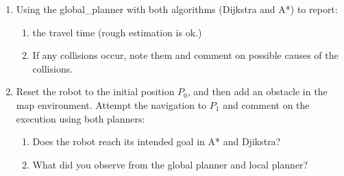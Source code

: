 \documentclass[12pt]{article}
\begin{document}
    \begin{enumerate}
    \item Using the global\_planner with both algorithms (Dijkstra and A*) to report:
    
        \begin{enumerate}
            \item the travel time (rough estimation is ok.)
            
            \item If any collisions occur, note them and comment on possible causes of the collisions.
        \end{enumerate}
    
    \item Reset the robot to the initial position $P_0$, and then add an obstacle in the map environment. Attempt the navigation to $P_1$ and comment on the execution using both planners:
    
    \begin{enumerate}
        \item Does the robot reach its intended goal in A* and Djikstra?
        \item What did you observe from the global planner and local planner?

    \end{enumerate}

    \end{enumerate}
\end{document}
